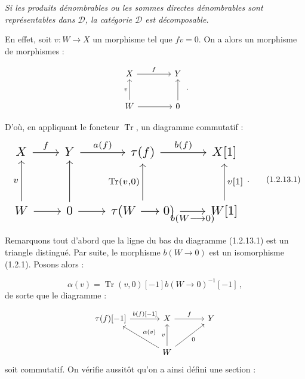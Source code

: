 \clearpage
{}%
\begingroup
\small
\setlength{\emergencystretch}{1.5em}%
\setlength{\abovedisplayskip}{4pt plus 2pt minus 2pt}%
\setlength{\belowdisplayskip}{4pt plus 2pt minus 2pt}%

\textit{Si les produits dénombrables ou les sommes directes dénombrables
sont représentables dans $\mathcal D$, la catégorie $\mathcal D$ est
décomposable.}

En effet, soit $v\colon W\longrightarrow X$ un morphisme tel que $fv=0$.
On a alors un morphisme de morphismes :

\[
  \begin{tikzcd}[column sep=4em,row sep=2.5em]
    X \arrow[r,"f"] & Y \\
    W \arrow[u,"v"] \arrow[r] & 0 \arrow[u]
  \end{tikzcd}
  \,.
\]

D'où, en appliquant le foncteur $\operatorname{Tr}$, un diagramme
commutatif :
\begin{equation}
  \resizebox{0.82\linewidth}{!}{%
    $\begin{tikzcd}[ampersand replacement=\&,column sep=2.05em,row sep=3em]
      X \arrow[r,"f"]
        \& Y \arrow[r,"{a(f)}"]
        \& \tau(f) \arrow[r,"{b(f)}"]
        \& X[1] \\
      W \arrow[u,"v"] \arrow[r]
        \& 0 \arrow[u] \arrow[r]
        \& \tau(W\longrightarrow 0) \arrow[u,"{\operatorname{Tr}(v,0)}"]
          \arrow[r,"{b(W\longrightarrow 0)}"']
        \& W[1] \arrow[u,"{v[1]}"']
    \end{tikzcd}$%
  }\,.
  \tag{1.2.13.1}
\end{equation}

Remarquons tout d'abord que la ligne du bas du diagramme (1.2.13.1) est
un triangle distingué. Par suite, le morphisme
$b(W\longrightarrow 0)$ est un isomorphisme (1.2.1). Posons alors :

\[
  \alpha(v)=\operatorname{Tr}(v,0)[-1]
  b(W\longrightarrow 0)^{-1}[-1]\,,
\]
de sorte que le diagramme :

\[
  \begin{tikzcd}[column sep=3.5em,row sep=2.4em]
    \tau(f)[-1] \arrow[r,"{b(f)[-1]}"]
      & X \arrow[r,"f"]
      & Y \\
      & W \arrow[ul,"{\alpha(v)}"'] \arrow[u,"v"] \arrow[ur,"0"']
  \end{tikzcd}
\]
soit commutatif. On vérifie aussitôt qu'on a ainsi défini une section :
\par

